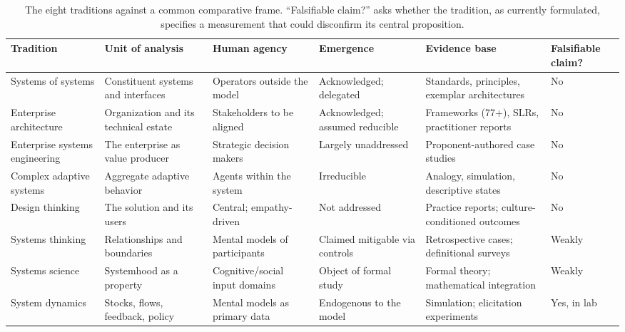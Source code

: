 \documentclass[11pt,a4paper]{article}
\begin{document}
\begin{table}[htbp]
\centering
\footnotesize
\caption{The eight traditions against a common comparative frame. ``Falsifiable
claim?'' asks whether the tradition, as currently formulated, specifies a
measurement that could disconfirm its central proposition.}
\label{tab:landscape}
\renewcommand{\arraystretch}{1.25}
\begin{tabular}{@{}p{1.9cm}p{2.2cm}p{2.3cm}p{2.1cm}p{2.5cm}p{1.6cm}@{}}
\toprule
\textbf{Tradition} & \textbf{Unit of analysis} & \textbf{Human agency} &
\textbf{Emergence} & \textbf{Evidence base} & \textbf{Falsifiable claim?} \\
\midrule
Systems of systems &
Constituent systems and interfaces &
Operators outside the model &
Acknowledged; delegated &
Standards, principles, exemplar architectures &
No \\

Enterprise architecture &
Organization and its technical estate &
Stakeholders to be aligned &
Acknowledged; assumed reducible &
Frameworks (77+), SLRs, practitioner reports &
No \\

Enterprise systems engineering &
The enterprise as value producer &
Strategic decision makers &
Largely unaddressed &
Proponent-authored case studies &
No \\

Complex adaptive systems &
Aggregate adaptive behavior &
Agents within the system &
Irreducible &
Analogy, simulation, descriptive states &
No \\

Design thinking &
The solution and its users &
Central; empathy-driven &
Not addressed &
Practice reports; culture-conditioned outcomes &
No \\

Systems thinking &
Relationships and boundaries &
Mental models of participants &
Claimed mitigable via controls &
Retrospective cases; definitional surveys &
Weakly \\

Systems science &
Systemhood as a property &
Cognitive/social input domains &
Object of formal study &
Formal theory; mathematical integration &
Weakly \\

System dynamics &
Stocks, flows, feedback, policy &
Mental models as primary data &
Endogenous to the model &
Simulation; elicitation experiments &
Yes, in lab \\
\bottomrule
\end{tabular}
\end{table}
\end{document}
